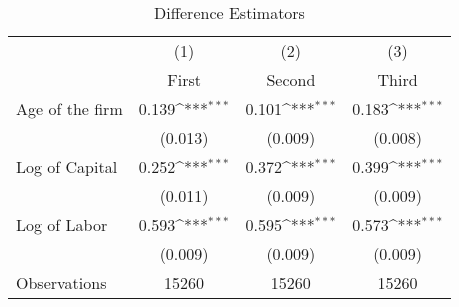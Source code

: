 \begin{table}[htbp]\centering
\def\sym#1{\ifmmode^{#1}\else\(^{#1}\)\fi}
\caption{Difference Estimators \label{tab:q3}}
\begin{tabular}{l*{3}{c}}
\toprule
                    &\multicolumn{1}{c}{(1)}&\multicolumn{1}{c}{(2)}&\multicolumn{1}{c}{(3)}\\
                    &\multicolumn{1}{c}{First}&\multicolumn{1}{c}{Second}&\multicolumn{1}{c}{Third}\\
\midrule
Age of the firm     &       0.139\sym{***}&       0.101\sym{***}&       0.183\sym{***}\\
                    &     (0.013)         &     (0.009)         &     (0.008)         \\
\addlinespace
Log of Capital      &       0.252\sym{***}&       0.372\sym{***}&       0.399\sym{***}\\
                    &     (0.011)         &     (0.009)         &     (0.009)         \\
\addlinespace
Log of Labor        &       0.593\sym{***}&       0.595\sym{***}&       0.573\sym{***}\\
                    &     (0.009)         &     (0.009)         &     (0.009)         \\
\midrule
Observations        &       15260         &       15260         &       15260         \\
\bottomrule
\end{tabular}
\end{table}
